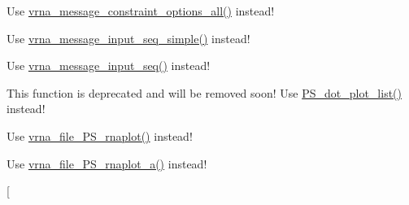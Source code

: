 \begin{DoxyRefList}
\item[\label{deprecated__deprecated000040}%
\hypertarget{deprecated__deprecated000040}{}%
global\+Scope$>$ Global \hyperlink{constraints_8h_ae8ae8a34962b9959be3f6c40f0a80ac1}{print\+\_\+tty\+\_\+constraint\+\_\+full} (void)]Use \hyperlink{group__constraints_gaec7e13fa0465c2acc7a621d1aecb709f}{vrna\+\_\+message\+\_\+constraint\+\_\+options\+\_\+all()} instead!  
\item[\label{deprecated__deprecated000146}%
\hypertarget{deprecated__deprecated000146}{}%
global\+Scope$>$ Global \hyperlink{utils_8h_a6bf778117d31b7fd90db435323f4ef74}{print\+\_\+tty\+\_\+input\+\_\+seq} (void)]Use \hyperlink{group__utils_gaee1dd652ca5b9e56b096963a1576f73b}{vrna\+\_\+message\+\_\+input\+\_\+seq\+\_\+simple()} instead!  
\item[\label{deprecated__deprecated000147}%
\hypertarget{deprecated__deprecated000147}{}%
global\+Scope$>$ Global \hyperlink{utils_8h_ae4ef89b662a3e9b5b5f0781d9757aba0}{print\+\_\+tty\+\_\+input\+\_\+seq\+\_\+str} (const char $\ast$s)]Use \hyperlink{group__utils_gaf4d194d558b0c975f269de01dea52460}{vrna\+\_\+message\+\_\+input\+\_\+seq()} instead!  
\item[\label{deprecated__deprecated000123}%
\hypertarget{deprecated__deprecated000123}{}%
global\+Scope$>$ Global \hyperlink{group__plotting__utils_ga689a97a7e3b8a2df14728b8204d9d57b}{P\+S\+\_\+dot\+\_\+plot} (char $\ast$string, char $\ast$file)]This function is deprecated and will be removed soon! Use \hyperlink{group__plotting__utils_ga00ea223b5cf02eb2faae5ff29f0d5e12}{P\+S\+\_\+dot\+\_\+plot\+\_\+list()} instead!  
\item[\label{deprecated__deprecated000119}%
\hypertarget{deprecated__deprecated000119}{}%
global\+Scope$>$ Global \hyperlink{group__plotting__utils_ga0873c7cc4cd7a11c9a2cea19dde7e9c9}{P\+S\+\_\+rna\+\_\+plot} (char $\ast$string, char $\ast$structure, char $\ast$file)]Use \hyperlink{group__plotting__utils_gabdc8f6548ba4a3bc3cd868ccbcfdb86a}{vrna\+\_\+file\+\_\+\+P\+S\+\_\+rnaplot()} instead!  
\item[\label{deprecated__deprecated000120}%
\hypertarget{deprecated__deprecated000120}{}%
global\+Scope$>$ Global \hyperlink{group__plotting__utils_ga47856b2504b566588785597b6ebb8271}{P\+S\+\_\+rna\+\_\+plot\+\_\+a} (char $\ast$string, char $\ast$structure, char $\ast$file, char $\ast$pre, char $\ast$post)]Use \hyperlink{group__plotting__utils_ga139a31dd0ba9fc6612431f67de901c31}{vrna\+\_\+file\+\_\+\+P\+S\+\_\+rnaplot\+\_\+a()} instead!  
\item[\label{deprecated__deprecated000121}%

\end{DoxyRefList}
